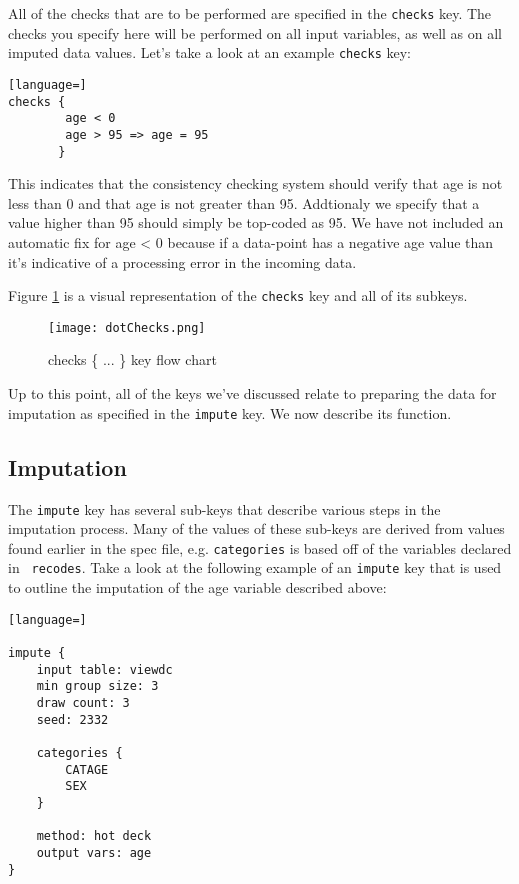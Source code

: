 \documentclass{article}
\begin{document}
All of the checks that are to be performed are specified in the {\tt checks} key. 
The checks you specify here will be performed on all input variables, as well as on all 
imputed data values. Let's take a look at an example {\tt checks} key:

\begin{lstlisting}[language=]
checks {
    	age < 0
        age > 95 => age = 95
       }
\end{lstlisting}

This indicates that the consistency checking system should verify that age is not less
than 0 and that age is not greater than 95. Addtionaly we specify that a value higher
than 95 should simply be top-coded as 95. We have not included an automatic fix for
age < 0 because if a data-point has a negative age value than it's indicative of a
processing error in the incoming data.

Figure \ref{checkflow} is a visual representation of the {\tt checks} key and all of its subkeys.

\begin{figure}
\begin{center}
\texttt{[image: dotChecks.png]}
\caption{checks \{ ... \} key flow chart}\label{checkflow}
\end{center}
\end{figure}

Up to this point, all of the keys we've discussed relate to preparing the data for
imputation as specified in the {\tt impute} key. We now describe its function.


\subsection{Imputation} \label{imputesec}
The {\tt impute} key has several sub-keys that describe various steps in the imputation
process. Many of the values of these sub-keys are derived from values found earlier
in the spec file, e.g. {\tt categories} is based off of the variables declared in {\tt
recodes}. Take a look at the following example of an {\tt impute} key that is used to
outline the imputation of the age variable described above:

\begin{lstlisting}[language=]

impute {
    input table: viewdc
    min group size: 3
    draw count: 3
    seed: 2332

    categories {
        CATAGE
        SEX
    }

    method: hot deck
    output vars: age
}


\end{lstlisting}
\end{document}
